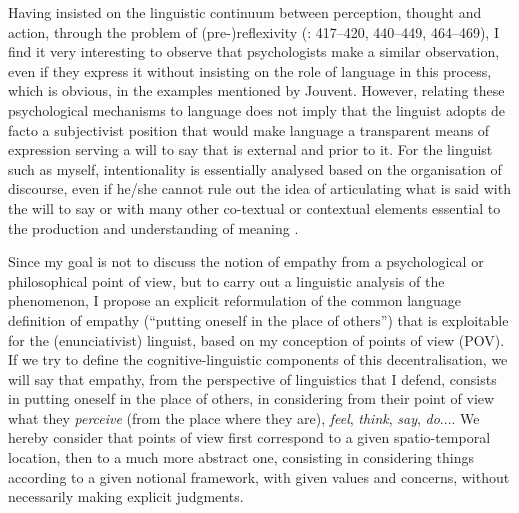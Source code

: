 \documentclass[output=paper]{langscibook}
\begin{document}
Having insisted on the linguistic continuum between perception, thought and action, through the problem of (pre-)reflexivity (\citealt{Rabatel2008b}: 417--420, 440--449, 464--469), I find it very interesting to observe that psychologists make a similar observation, even if they express it without insisting on the role of language in this process, which is obvious, in the examples mentioned by Jouvent. However, relating these psychological mechanisms to language does not imply that the linguist adopts de facto a subjectivist position that would make language a transparent means of expression serving a will to say that is external and prior to it. For the linguist such as myself, intentionality is essentially analysed based on the organisation of discourse, even if he/she cannot rule out the idea of articulating what is said with the will to say or with many other co-textual or contextual elements essential to the production and understanding of meaning \citep[211--213]{Rabatel2014}.

Since my goal is not to discuss the notion of empathy from a psychological or philosophical point of view, but to carry out a linguistic analysis of the phenomenon, I propose an explicit reformulation of the common language definition of empathy (“putting oneself in the place of others”) that is exploitable for the (enunciativist) linguist, based on my conception of points of view (POV). If we try to define the cognitive-linguistic components of this decentralisation, we will say that empathy, from the perspective of linguistics that I defend, consists in putting oneself in the place of others, in considering from their point of view what they \textit{perceive} (from the place where they are), \textit{feel}, \textit{think}, \textit{say}, \textit{do}.... We hereby consider that points of view first correspond to a given spatio-temporal location, then to a much more abstract one, consisting in considering things according to a given notional framework, with given values and concerns, without necessarily making explicit judgments.
\end{document}
